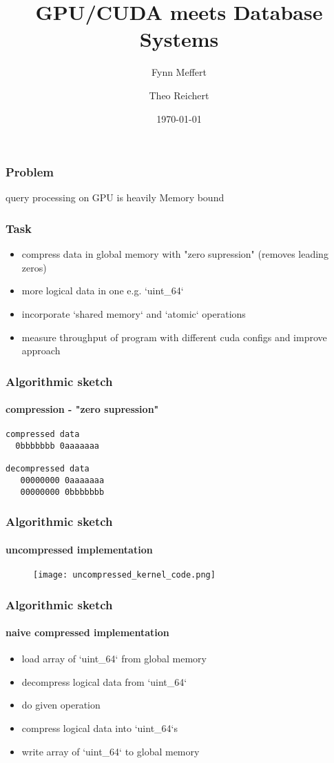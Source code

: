 \documentclass{beamer}
\title{GPU/CUDA meets Database Systems}
\author{Fynn Meffert \and Theo Reichert}
\date{\today}
\begin{document}
\frame{\titlepage}

\begin{frame}
    \frametitle{Problem}
    query processing on GPU is heavily Memory bound
\end{frame}

\begin{frame}
    \frametitle{Task}
    \begin{itemize}
        \item compress data in global memory with "zero supression"
          (removes leading zeros)
        \item more logical data in one e.g. `uint\_64`
        \item incorporate `shared memory` and `atomic` operations
        \item measure throughput of program with different cuda configs
          and improve approach
     \end{itemize}
\end{frame}

\begin{frame}[fragile]
    \frametitle{Algorithmic sketch}
    \framesubtitle{compression - "zero supression"}
    \begin{lstlisting}
compressed data
  0bbbbbbb 0aaaaaaa

decompressed data
   00000000 0aaaaaaa
   00000000 0bbbbbbb
    \end{lstlisting}
\end{frame}


\begin{frame}
    \frametitle{Algorithmic sketch}
    \framesubtitle{uncompressed implementation}
         \begin{figure}
             \centering
             \texttt{[image: uncompressed\_kernel\_code.png]} %
         \end{figure}
\end{frame}


\begin{frame}
    \frametitle{Algorithmic sketch}
    \framesubtitle{naive compressed implementation}
    \begin{itemize}
        \item load array of `uint\_64` from global memory
        \item decompress logical data from `uint\_64`
        \item do given operation
        \item compress logical data into `uint\_64`s
        \item write array of `uint\_64` to global memory
     \end{itemize}
\end{frame}
\end{document}
